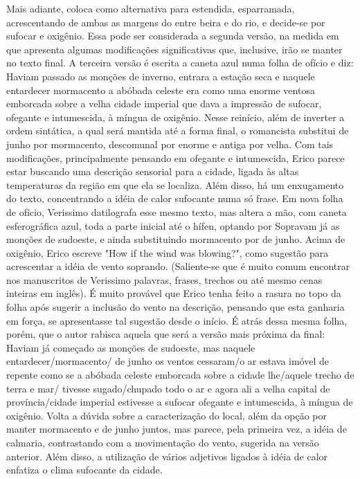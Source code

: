 Mais adiante, coloca como alternativa para  estendida,  esparramada, acrescentando  de ambas as margens do entre  beira e  do rio, e decide-se por  sufocar e  oxigênio. Essa pode ser considerada a segunda versão, na medida em que apresenta algumas modificações significativas que, inclusive, irão se manter no texto final.
A terceira versão é escrita a caneta azul numa folha de ofício e diz:  Haviam passado as monções de inverno, entrara a estação seca e naquele entardecer mormacento a abóbada celeste era como uma enorme ventosa emborcada sobre a velha cidade imperial que dava a impressão de sufocar, ofegante e intumescida, à míngua de oxigênio. Nesse reinício, além de inverter a ordem sintática, a qual será mantida até a forma final, o romancista substitui  de junho por  mormacento,  descomunal por  enorme e  antiga por  velha.
Com tais modificações, principalmente pensando em  ofegante e  intumescida, Erico parece estar buscando uma descrição sensorial para a cidade, ligada às altas temperaturas da região em que ela se localiza. Além disso, há um enxugamento do texto, concentrando a idéia de calor sufocante numa só frase.
Em nova folha de ofício, Verissimo datilografa esse mesmo texto, mas altera a mão, com caneta esferográfica azul, toda a parte inicial até o hífen, optando por  Sopravam já as monções de sudoeste, e ainda substituindo  mormacento por  de junho.
Acima de  oxigênio, Erico escreve "How if the wind was blowing?", como sugestão para acrescentar a idéia de vento soprando. (Saliente-se que é muito comum encontrar nos manuscritos de Verissimo palavras, frases, trechos ou até mesmo cenas inteiras em inglês). É muito provável que Erico tenha feito a rasura no topo da folha após sugerir a inclusão do vento na descrição, pensando que esta ganharia em força, se apresentasse tal sugestão desde o início.
É atrás dessa mesma folha, porém, que o autor rabisca aquela que será a versão mais próxima da final:  Haviam já começado as monções de sudoeste, mas naquele entardecer/mormacento/ de junho os ventos cessaram/o ar estava imóvel de repente como se a abóbada celeste emborcada sobre a cidade lhe/aquele trecho de terra e mar/ tivesse sugado/chupado todo o ar e agora ali a velha capital de província/cidade imperial estivesse a sufocar ofegante e intumescida, à míngua de oxigênio. Volta a dúvida sobre a caracterização do local, além da opção por manter mormacento e de junho juntos, mas parece, pela primeira vez, a idéia de calmaria, contrastando com a movimentação do vento, sugerida na versão anterior. Além disso, a utilização de vários adjetivos ligados à idéia de calor enfatiza o clima sufocante da cidade.
